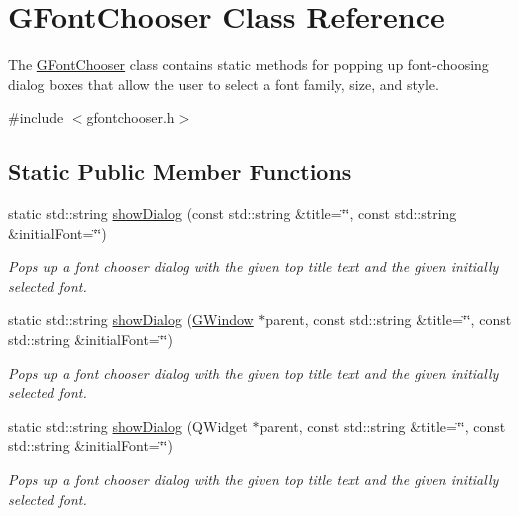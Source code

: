 \hypertarget{classGFontChooser}{}\section{G\+Font\+Chooser Class Reference}
\label{classGFontChooser}


The \mbox{\hyperlink{classGFontChooser}{G\+Font\+Chooser}} class contains static methods for popping up font-\/choosing dialog boxes that allow the user to select a font family, size, and style.  




{\ttfamily \#include $<$gfontchooser.\+h$>$}

\subsection*{Static Public Member Functions}
\begin{DoxyCompactItemize}
\item 
static std\+::string \mbox{\hyperlink{classGFontChooser_a93eece7081780910ac5878dc6c809f94}{show\+Dialog}} (const std\+::string \&title=\char`\"{}\char`\"{}, const std\+::string \&initial\+Font=\char`\"{}\char`\"{})
\begin{DoxyCompactList}\small\item\em Pops up a font chooser dialog with the given top title text and the given initially selected font. \end{DoxyCompactList}\item 
static std\+::string \mbox{\hyperlink{classGFontChooser_a67dee62efca9f2c7fb6d80891a73c32f}{show\+Dialog}} (\mbox{\hyperlink{classGWindow}{G\+Window}} $\ast$parent, const std\+::string \&title=\char`\"{}\char`\"{}, const std\+::string \&initial\+Font=\char`\"{}\char`\"{})
\begin{DoxyCompactList}\small\item\em Pops up a font chooser dialog with the given top title text and the given initially selected font. \end{DoxyCompactList}\item 
static std\+::string \mbox{\hyperlink{classGFontChooser_a7e0ac529f6e2c4877b13e7a2f06a1bea}{show\+Dialog}} (Q\+Widget $\ast$parent, const std\+::string \&title=\char`\"{}\char`\"{}, const std\+::string \&initial\+Font=\char`\"{}\char`\"{})
\begin{DoxyCompactList}\small\item\em Pops up a font chooser dialog with the given top title text and the given initially selected font. \end{DoxyCompactList}\end{DoxyCompactItemize}


